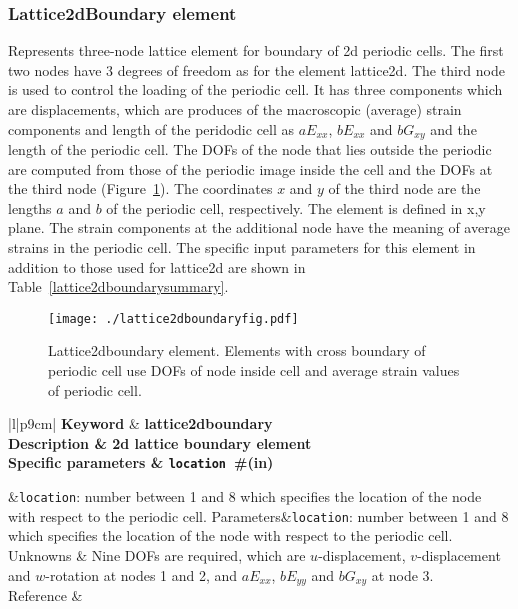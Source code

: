 \documentclass[a4paper]{article}
\newcommand{\param}[1]{\texttt{#1}} %
\newcommand{\field}[2]{\param{#1}~\#{\tiny(#2)}} %
\newcommand{\templabel}{}%
\newcommand{\tempcaption}{}%
\newcounter{nelpar}
\newenvironment{elementsummary}[5]{%
  \gdef\tempcaption{#4}%
  \gdef\templabel{#5}%
  \setcounter{nelpar}{0}%
  \begin{center} %
    \begin{table}[!htb] %
      \begin{tabular}{|l|p{9cm}|}\hline %
        {\bf Keyword} & \bf{#1}\\ %
        {Description} & {#2}\\ %
        {Specific parameters} & {#3}\\ \hline %
}{
  \\ \hline %
      \end{tabular}%
      \caption{\tempcaption}%
      \label{\templabel}%
    \end{table}%
  \end{center}%
}
\newcommand{\elementParam}[1]{%
  \ifthenelse{\value{nelpar}>0} %
             {&{#1}}%
             {\setcounter{nelpar}{1}Parameters&{#1}}%
             \\%
}
\newcommand{\elementDescription}[2]{{#1} & {#2}\\ }
\begin{document}
\subsubsection{Lattice2dBoundary element}
Represents three-node lattice element for boundary of 2d periodic cells. The first two nodes have 3 degrees of freedom as for the element lattice2d. The third node is used to control the loading of the periodic cell. It has three components which are displacements, which are produces of the macroscopic (average) strain components and length of the peridodic cell as $aE_{xx}$, $bE_{xx}$  and $bG_{xy}$ and the length of the periodic cell. The DOFs of the node that lies outside the periodic are computed from those of the periodic image inside the cell and the DOFs at the third node (Figure~\ref{lattice2dboundaryfig}). The coordinates $x$ and $y$ of the third node are the lengths $a$ and $b$ of the periodic cell, respectively.  The element is defined in x,y plane. The strain components at the additional node have the meaning of average strains in the periodic cell. The specific input parameters for this element in addition to those used for lattice2d are shown in Table~\ref{lattice2dboundarysummary}. 
\begin{figure}[htb]
  \centering
  \texttt{[image: ./lattice2dboundaryfig.pdf]}
 \caption{Lattice2dboundary element. Elements with cross boundary of periodic cell use DOFs of node inside cell and average strain values of periodic cell.}
 \label{lattice2dboundaryfig}
\end{figure}

\begin{elementsummary}{lattice2dboundary}{2d lattice boundary element}{\field{location}{in}}{lattice2dboundary element summary}{lattice2dboundarysummary}

\elementParam{\param{location}: number between 1 and 8 which specifies the location of the node with respect to the periodic cell.}

\elementDescription{Unknowns}{Nine DOFs are required, which are $u$-displacement, $v$-displacement and $w$-rotation at nodes 1 and 2, and $aE_{xx}$, $bE_{yy}$ and $bG_{xy}$ at node 3.}
\elementDescription{Reference}{\cite{GraJir10}}
\end{elementsummary}
\end{document}
